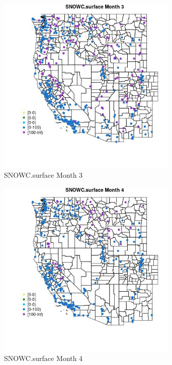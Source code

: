 \begin{figure} 
\centering  
\includegraphics[width=0.77\textwidth]{Code_Outputs/Report_ML_input_PM25_Step4_part_e_de_duplicated_aves_compiled_2019-05-18wNAs_MapObsMo3SNOWCsurface.jpg} 
\caption{\label{fig:Report_ML_input_PM25_Step4_part_e_de_duplicated_aves_compiled_2019-05-18wNAsMapObsMo3SNOWCsurface}SNOWC.surface Month 3} 
\end{figure} 
 

\begin{figure} 
\centering  
\includegraphics[width=0.77\textwidth]{Code_Outputs/Report_ML_input_PM25_Step4_part_e_de_duplicated_aves_compiled_2019-05-18wNAs_MapObsMo4SNOWCsurface.jpg} 
\caption{\label{fig:Report_ML_input_PM25_Step4_part_e_de_duplicated_aves_compiled_2019-05-18wNAsMapObsMo4SNOWCsurface}SNOWC.surface Month 4} 
\end{figure} 
 

